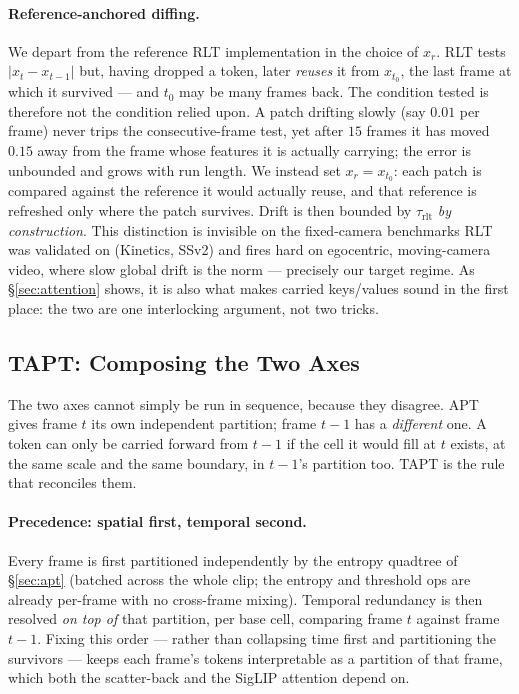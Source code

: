 \paragraph{Reference-anchored diffing.}
We depart from the reference RLT implementation in the choice of $x_r$. RLT tests
$|x_t - x_{t-1}|$ but, having dropped a token, later \emph{reuses} it from
$x_{t_0}$, the last frame at which it survived --- and $t_0$ may be many frames
back. The condition tested is therefore not the condition relied upon. A patch
drifting slowly (say $0.01$ per frame) never trips the consecutive-frame test,
yet after $15$ frames it has moved $0.15$ away from the frame whose features it
is actually carrying; the error is unbounded and grows with run length. We
instead set $x_r = x_{t_0}$: each patch is compared against the reference it
would actually reuse, and that reference is refreshed only where the patch
survives. Drift is then bounded by $\tau_{\text{rlt}}$ \emph{by construction}.
This distinction is invisible on the fixed-camera benchmarks RLT was validated on
(Kinetics, SSv2) and fires hard on egocentric, moving-camera video, where slow
global drift is the norm --- precisely our target regime. As
\S\ref{sec:attention} shows, it is also what makes carried keys/values sound in
the first place: the two are one interlocking argument, not two tricks.

\subsection{TAPT: Composing the Two Axes}
\label{sec:tapt}

The two axes cannot simply be run in sequence, because they disagree. APT gives
frame $t$ its own independent partition; frame $t-1$ has a \emph{different} one.
A token can only be carried forward from $t-1$ if the cell it would fill at $t$
exists, at the same scale and the same boundary, in $t-1$'s partition too. TAPT
is the rule that reconciles them.

\paragraph{Precedence: spatial first, temporal second.}
Every frame is first partitioned independently by the entropy quadtree of
\S\ref{sec:apt} (batched across the whole clip; the entropy and threshold ops are
already per-frame with no cross-frame mixing). Temporal redundancy is then
resolved \emph{on top of} that partition, per base cell, comparing frame $t$
against frame $t-1$. Fixing this order --- rather than collapsing time first and
partitioning the survivors --- keeps each frame's tokens interpretable as a
partition of that frame, which both the scatter-back and the SigLIP attention
depend on.

